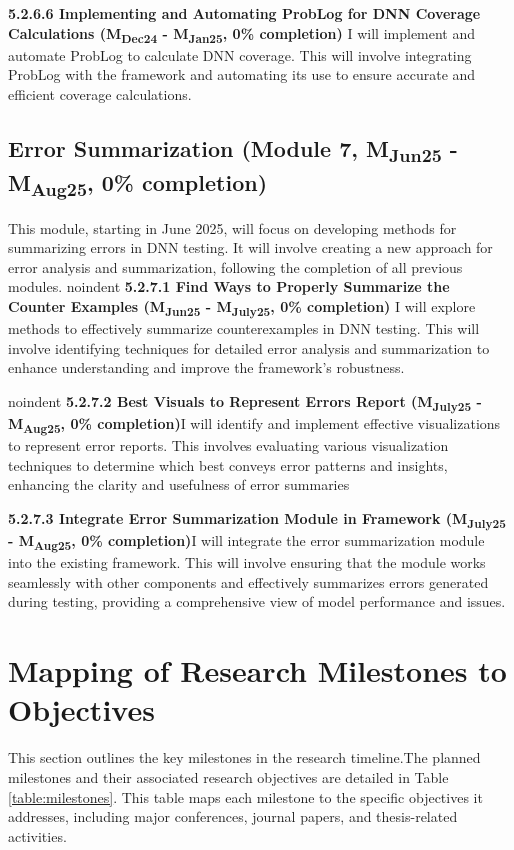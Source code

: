 \noindent \textbf{5.2.6.6 Implementing and Automating ProbLog for DNN Coverage Calculations (M\textsubscript{Dec24} - M\textsubscript{Jan25}, 0\% completion)} I will implement and automate ProbLog to calculate DNN coverage. This will involve integrating ProbLog with the framework and automating its use to ensure accurate and efficient coverage calculations.


\subsection{Error Summarization (Module 7, M\textsubscript{Jun25} - M\textsubscript{Aug25}, 0\% completion)}This module, starting in June 2025, will focus on developing methods for summarizing errors in DNN testing. It will involve creating a new approach for error analysis and summarization, following the completion of all previous modules.
noindent \textbf{5.2.7.1 Find Ways to Properly Summarize the Counter Examples (M\textsubscript{Jun25} - M\textsubscript{July25}, 0\% completion)} I will explore methods to effectively summarize counterexamples in DNN testing. This will involve identifying techniques for detailed error analysis and summarization to enhance understanding and improve the framework's robustness.

noindent \textbf{5.2.7.2 Best Visuals to Represent Errors Report (M\textsubscript{July25} - M\textsubscript{Aug25}, 0\% completion)}I will identify and implement effective visualizations to represent error reports. This involves evaluating various visualization techniques to determine which best conveys error patterns and insights, enhancing the clarity and usefulness of error summaries

\noindent \textbf{5.2.7.3 Integrate Error Summarization Module in Framework (M\textsubscript{July25} - M\textsubscript{Aug25}, 0\% completion)}I will integrate the error summarization module into the existing framework. This will involve ensuring that the module works seamlessly with other components and effectively summarizes errors generated during testing, providing a comprehensive view of model performance and issues.

\section{Mapping of Research Milestones to Objectives}
This section outlines the key milestones in the research timeline.The planned milestones and their associated research objectives are detailed in Table \ref{table:milestones}. This table maps each milestone to the specific objectives it addresses, including major conferences, journal papers, and thesis-related activities.

